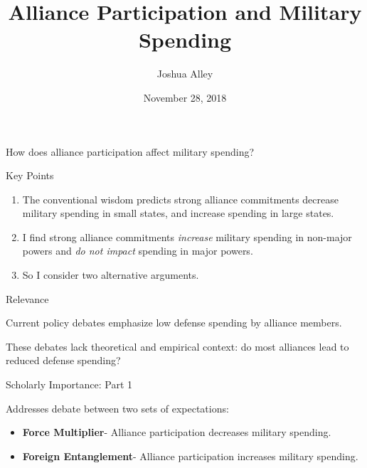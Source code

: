 \documentclass{beamer}
\title{Alliance Participation and Military Spending}
\date{November 28, 2018}
\author{Joshua Alley}
\institute{Texas A\&M University}
\begin{document}
 \maketitle




 \begin{frame}[standout]

How does alliance participation affect military spending? 

 \end{frame}



 \begin{frame}{Key Points} 

\begin{enumerate}
\item The conventional wisdom predicts strong alliance commitments decrease military spending in small states, and increase spending in large states.
\pause
\item I find strong alliance commitments \textit{increase} military spending in non-major powers and \textit{do not impact} spending in major powers.
\pause
\item So I consider two alternative arguments.
\end{enumerate}

 \end{frame}


 \begin{frame}{Relevance}

Current policy debates emphasize low defense spending by alliance members. 

These debates lack theoretical and empirical context: do most alliances lead to reduced defense spending? 


 \end{frame}



\begin{frame}{Scholarly Importance: Part 1}

Addresses debate between two sets of expectations:
\pause 

\begin{itemize}
\item \textbf{Force Multiplier}- Alliance participation decreases military spending.
\pause 
\item \textbf{Foreign Entanglement}- Alliance participation increases military spending.
\end{itemize} 


 \end{frame}
\end{document}
